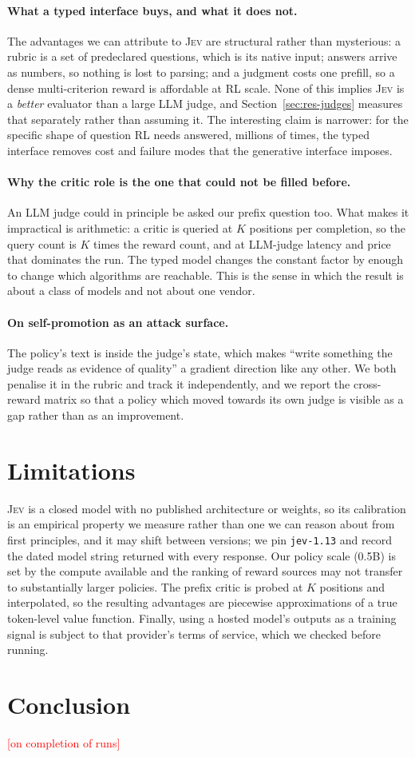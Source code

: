 \documentclass[11pt]{article}
\newcommand{\jev}{\textsc{Jev}}
\newcommand{\todo}[1]{\textcolor{red}{[#1]}}
\begin{document}
\paragraph{What a typed interface buys, and what it does not.} The advantages
we can attribute to \jev{} are structural rather than mysterious: a rubric is a
set of predeclared questions, which is its native input; answers arrive as
numbers, so nothing is lost to parsing; and a judgment costs one prefill, so a
dense multi-criterion reward is affordable at RL scale. None of this implies
\jev{} is a \emph{better} evaluator than a large LLM judge, and
Section~\ref{sec:res-judges} measures that separately rather than assuming it.
The interesting claim is narrower: for the specific shape of question RL needs
answered, millions of times, the typed interface removes cost and failure modes
that the generative interface imposes.

\paragraph{Why the critic role is the one that could not be filled before.}
An LLM judge could in principle be asked our prefix question too. What makes it
impractical is arithmetic: a critic is queried at $K$ positions per completion,
so the query count is $K$ times the reward count, and at LLM-judge latency and
price that dominates the run. The typed model changes the constant factor by
enough to change which algorithms are reachable. This is the sense in which the
result is about a class of models and not about one vendor.

\paragraph{On self-promotion as an attack surface.} The policy's text is inside
the judge's state, which makes ``write something the judge reads as evidence of
quality'' a gradient direction like any other. We both penalise it in the
rubric and track it independently, and we report the cross-reward matrix so
that a policy which moved towards its own judge is visible as a gap rather than
as an improvement.

\section{Limitations}
\jev{} is a closed model with no published architecture or weights, so its
calibration is an empirical property we measure rather than one we can reason
about from first principles, and it may shift between versions; we pin
\texttt{jev-1.13} and record the dated model string returned with every
response. Our policy scale (0.5B) is set by the compute available and the
ranking of reward sources may not transfer to substantially larger policies.
The prefix critic is probed at $K$ positions and interpolated, so the resulting
advantages are piecewise approximations of a true token-level value function.
Finally, using a hosted model's outputs as a training signal is subject to that
provider's terms of service, which we checked before running.

\section{Conclusion}
\todo{on completion of runs}



\end{document}
